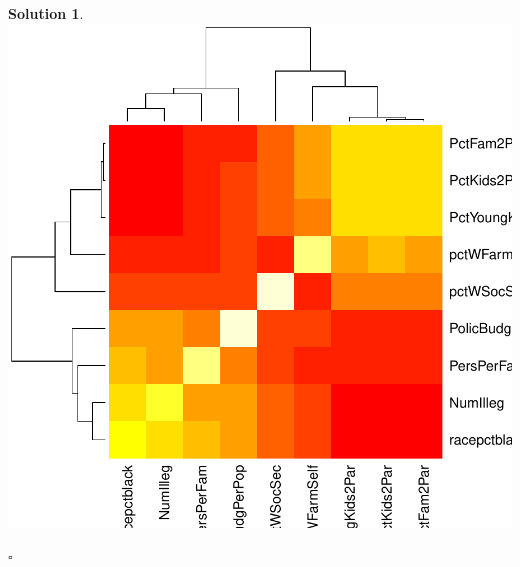 \documentclass[twoside]{article}
\theoremstyle{definition}
\newtheorem*{solutionT}{Solution}
\newenvironment{solution}{\begin{cBox}\begin{solutionT}}{\hfill{\scriptsize\ensuremath{\square}}\end{solutionT}\end{cBox}}
\theoremstyle{definition}
\begin{document}
\begin{enumerate}
\begin{solution}
\includegraphics{week1-025}

\end{solution}
\end{enumerate}
\end{document}
